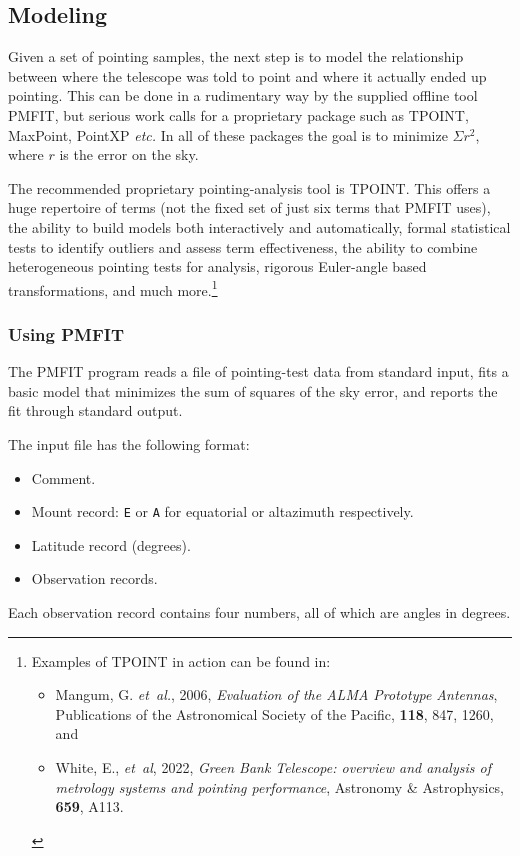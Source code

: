\documentclass[11pt,fleqn,twoside,\paper]{article}
\renewcommand{\_}{{\tt\char'137}}     %
\begin{document}
\subsection{Modeling}
\label{modeling}

Given a set of pointing samples, the next step is to model
the relationship between where the telescope was told to
point and where it actually ended up pointing.  This can be done
in a rudimentary way by the supplied offline tool PMFIT, but serious
work calls for a proprietary package such as TPOINT,
MaxPoint, PointXP {\it etc.}  In all of these packages
the goal is to minimize $\Sigma r^2$, where $r$ is the error
on the sky.

The recommended proprietary pointing-analysis tool is TPOINT.
This offers a huge repertoire of terms (not the fixed set
of just six terms that PMFIT uses), the ability to
build models both interactively and automatically, formal statistical
tests to identify outliers and assess
term effectiveness, the ability to
combine heterogeneous
pointing tests for analysis, rigorous Euler-angle based
transformations, and much more.\footnote{Examples
of TPOINT in action can be found in:
\begin{itemize}
\item Mangum, G. {\it et~al.}, 2006, {\it Evaluation of the
ALMA Prototype Antennas}, Publications of the Astronomical
Society of the Pacific, {\bf 118}, 847, 1260, and
\item White, E., {\it et~al}, 2022,
{\it Green Bank Telescope: overview and analysis
of metrology systems and
pointing performance}, Astronomy \& Astrophysics, {\bf 659}, A113.
\end{itemize}}

\subsubsection{Using PMFIT}
\label{pmfit}
The PMFIT program reads a file of pointing-test data
from standard input, fits a basic model that minimizes the sum
of squares of the sky error,
and reports the fit through standard output.

The input file has the following format:
\begin{itemize}
\item Comment.
\item Mount record: {\tt E} or {\tt A} for equatorial or altazimuth
      respectively.
\item Latitude record (degrees).
\item Observation records.
\end{itemize}
Each observation record contains four numbers, all
of which are angles in degrees.
\end{document}
